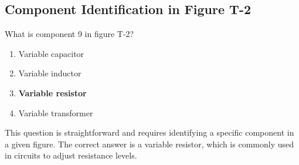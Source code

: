 \subsection{Component Identification in Figure T-2}
\label{T6C08}

\begin{tcolorbox}[colback=gray!10!white,colframe=black!75!black,title=T6C08]
What is component 9 in figure T-2?
\begin{enumerate}[noitemsep]
    \item Variable capacitor
    \item Variable inductor
    \item \textbf{Variable resistor}
    \item Variable transformer
\end{enumerate}
\end{tcolorbox}

This question is straightforward and requires identifying a specific component in a given figure. The correct answer is a variable resistor, which is commonly used in circuits to adjust resistance levels.
